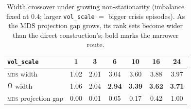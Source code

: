 \begin{table}[htb]
  \centering
  \caption[Width crossover]{Width crossover under growing non-stationarity (imbalance
  fixed at $0.4$; larger \texttt{vol\_scale} $=$ bigger crisis episodes). As the MDS
  projection gap grows, its rank sets become wider than the direct construction's;
  bold marks the narrower route.}
  \label{tab:mc-crossover}
  \small
  \begin{tabular}{lcccccc}
    \toprule
    \texttt{vol\_scale} & 1 & 3 & 6 & 10 & 16 & 24\\
    \midrule
    \textsc{mds} width          & 1.02 & 2.01 & 3.04 & 3.60 & 3.88 & 3.97\\
    $\Omega$ width        & 1.06 & 2.04 & \textbf{2.94} & \textbf{3.39} & \textbf{3.62} & \textbf{3.71}\\
    \textsc{mds} projection gap & 0.00 & 0.01 & 0.05 & 0.17 & 0.42 & 1.00\\
    \bottomrule
  \end{tabular}
\end{table}
